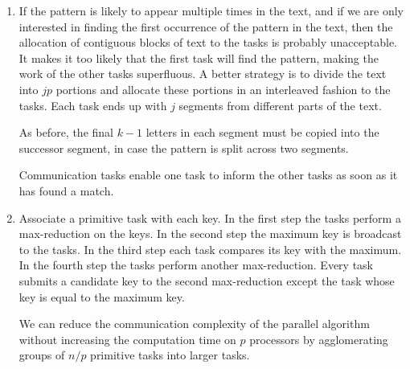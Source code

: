 \begin{enumerate}
      After the tasks have completed their portions of the search, a
      gather communication brings together information about all occurrences
      of the pattern.

      In the following task/channel graph, the straight arrows represent
      channels used to copy the last final $k-1$ letters of each task's
      section to its successor task. The curved arrows represent channels
      used for the gather step.

      \begin{center}
      \end{center}

\item If the pattern is likely to appear multiple times in the text, and if
      we are only interested in finding the first occurrence of the pattern
      in the text, then the allocation of contiguous blocks of text to
      the tasks is probably unacceptable.
      It makes it too likely that the first task will find the pattern,
      making the work of the other tasks superfluous. A better strategy is to
      divide the text into $jp$ portions and allocate these portions in an
      interleaved fashion to the tasks. Each task ends up with $j$ segments
      from different parts of the text.

      \begin{center}
      \end{center}

      As before, the final $k-1$ letters in each segment must be copied into
      the successor segment, in case the pattern is split across two segments.

      Communication tasks enable one task
      to inform the other tasks as soon as it has found a match.

\item Associate a primitive task with each key.
      In the first step the tasks perform a max-reduction on the keys.
      In the second step the maximum key is broadcast to the tasks.
      In the third step each task compares its key with the maximum.
      In the fourth step the tasks perform another max-reduction.
      Every task submits a candidate key to the second max-reduction
      except the task whose key is equal to the maximum key.

      We can reduce the communication complexity of the parallel algorithm
      without increasing the computation time on $p$ processors by
      agglomerating groups of $n/p$ primitive tasks into larger tasks.


\end{enumerate}
